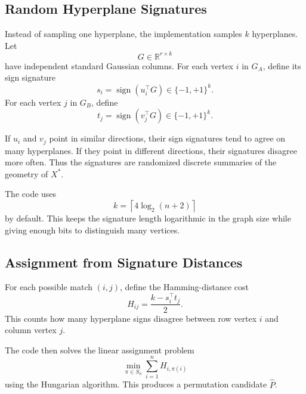 \documentclass[11pt]{article}
\begin{document}
\subsection{Random Hyperplane Signatures}

Instead of sampling one hyperplane, the implementation samples $k$ hyperplanes.
Let
\begin{equation}
    G\in\mathbb{R}^{r\times k}
\end{equation}
have independent standard Gaussian columns.
For each vertex $i$ in $G_A$, define its sign signature
\begin{equation}
    s_i
    =
    \operatorname{sign}(u_i^\top G)
    \in\{-1,+1\}^k.
\end{equation}
For each vertex $j$ in $G_B$, define
\begin{equation}
    t_j
    =
    \operatorname{sign}(v_j^\top G)
    \in\{-1,+1\}^k.
\end{equation}

If $u_i$ and $v_j$ point in similar directions, their sign signatures tend to
agree on many hyperplanes.
If they point in different directions, their signatures disagree more often.
Thus the signatures are randomized discrete summaries of the geometry of
$X^*$.

The code uses
\begin{equation}
    k = \left\lceil 4\log_2(n+2)\right\rceil
\end{equation}
by default.
This keeps the signature length logarithmic in the graph size while giving
enough bits to distinguish many vertices.

\subsection{Assignment from Signature Distances}

For each possible match $(i,j)$, define the Hamming-distance cost
\begin{equation}
    H_{ij}
    =
    \frac{k - s_i^\top t_j}{2}.
\end{equation}
This counts how many hyperplane signs disagree between row vertex $i$ and
column vertex $j$.

The code then solves the linear assignment problem
\begin{equation}
    \min_{\pi\in S_n}
    \sum_{i=1}^n H_{i,\pi(i)}
\end{equation}
using the Hungarian algorithm.
This produces a permutation candidate $\hat P$.
\end{document}
